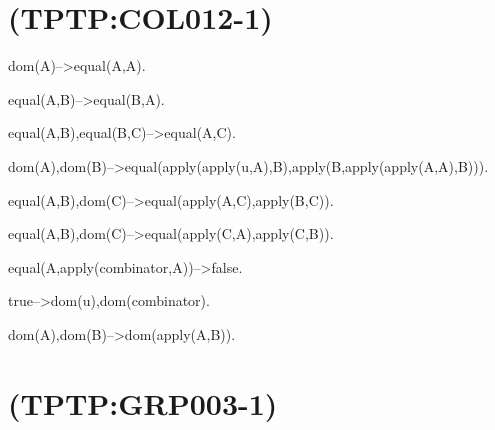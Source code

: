 \newline
\section{(TPTP:COL012-1)}



dom(A)-->equal(A,A).

equal(A,B)-->equal(B,A).

equal(A,B),equal(B,C)-->equal(A,C).

dom(A),dom(B)-->equal(apply(apply(u,A),B),apply(B,apply(apply(A,A),B))).

equal(A,B),dom(C)-->equal(apply(A,C),apply(B,C)).

equal(A,B),dom(C)-->equal(apply(C,A),apply(C,B)).

equal(A,apply(combinator,A))-->false.

true-->dom(u),dom(combinator).

dom(A),dom(B)-->dom(apply(A,B)).

\newline
\section{(TPTP:GRP003-1)}


